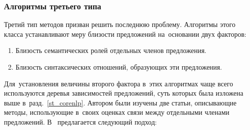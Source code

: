 \subsubsection{Алгоритмы третьего типа}
\label{sec:third_type_algorithm}
Третий тип методов призван решить последнюю проблему. 
Алгоритмы этого класса устанавливают меру близости предложений на~основании двух факторов:

\begin{enumerate}

\item{
Близость семантических ролей отдельных членов предложения.
}

\item{
Близость синтаксических отношений, образующих эти предложения.
}

\end{enumerate}

Для~установления величины второго фактора в~этих алгоритмах чаще всего используются
деревья зависимостей предложений, суть которых была изложена выше в~разд.~\ref{st_corenlp}.
Автором были изучены две статьи, описывающие методы, 
использующие в~своих оценках связи между отдельными членами предложений.
В~\cite{weightedDep} предлагается следующий подход:

